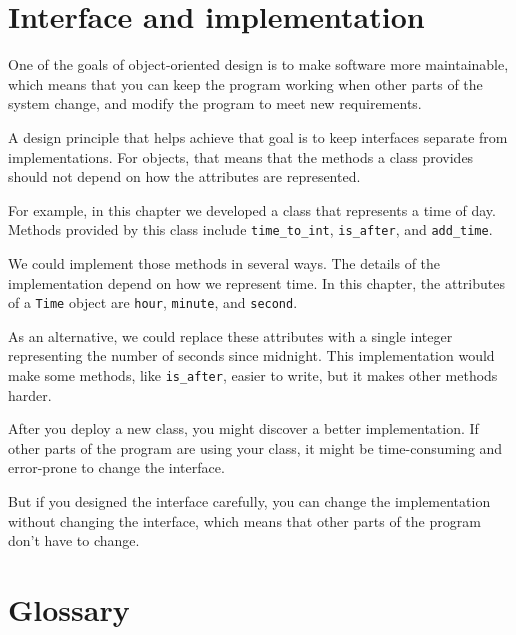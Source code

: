 \documentclass[10pt]{book}
\begin{document}
\section{Interface and implementation}

One of the goals of object-oriented design is to make software more
maintainable, which means that you can keep the program working when
other parts of the system change, and modify the program to meet new
requirements.

A design principle that helps achieve that goal is to keep
interfaces separate from implementations.  For objects, that means
that the methods a class provides should not depend on how the
attributes are represented.

For example, in this chapter we developed a class that represents
a time of day.  Methods provided by this class include
\verb"time_to_int", \verb"is_after", and \verb"add_time".

We could implement those methods in several ways.  The details of the
implementation depend on how we represent time.  In this chapter, the
attributes of a {\tt Time} object are {\tt hour}, {\tt minute}, and
{\tt second}.

As an alternative, we could replace these attributes with
a single integer representing the number of seconds
since midnight.  This implementation would make some methods,
like \verb"is_after", easier to write, but it makes other methods
harder.

After you deploy a new class, you might discover a better
implementation.  If other parts of the program are using your
class, it might be time-consuming and error-prone to change the
interface.

But if you designed the interface carefully, you can
change the implementation without changing the interface, which
means that other parts of the program don't have to change.


\section{Glossary}
\end{document}
